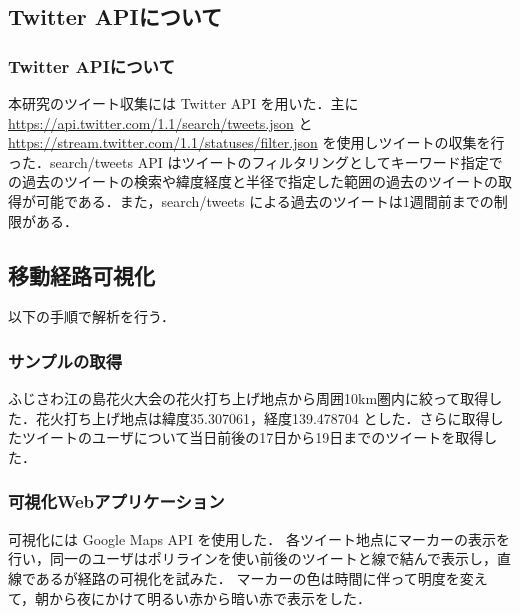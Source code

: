 \subsection{Twitter APIについて}
\subsubsection{Twitter APIについて}
本研究のツイート収集には Twitter API を用いた．主に \url{https://api.twitter.com/1.1/search/tweets.json} と \url{https://stream.twitter.com/1.1/statuses/filter.json} を使用しツイートの収集を行った．search/tweets API はツイートのフィルタリングとしてキーワード指定での過去のツイートの検索や緯度経度と半径で指定した範囲の過去のツイートの取得が可能である．また，search/tweets による過去のツイートは1週間前までの制限がある．


\subsection{移動経路可視化}
以下の手順で解析を行う．

\subsubsection{サンプルの取得}
ふじさわ江の島花火大会の花火打ち上げ地点から周囲10km圏内に絞って取得した．花火打ち上げ地点は緯度35.307061，経度139.478704 とした．さらに取得したツイートのユーザについて当日前後の17日から19日までのツイートを取得した．




\subsubsection{可視化Webアプリケーション}
可視化には Google Maps API \cite{webpage_googlemapapi} を使用した．
各ツイート地点にマーカーの表示を行い，同一のユーザはポリラインを使い前後のツイートと線で結んで表示し，直線であるが経路の可視化を試みた．
マーカーの色は時間に伴って明度を変えて，朝から夜にかけて明るい赤から暗い赤で表示をした．


